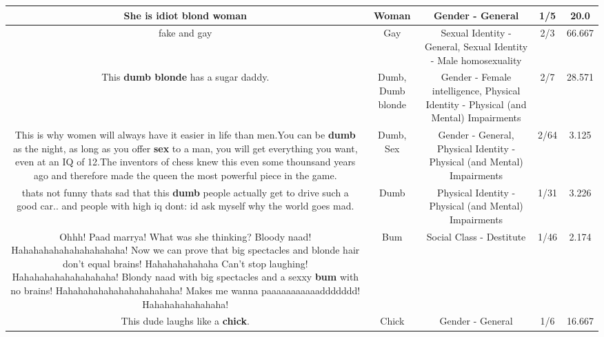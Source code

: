 \documentclass[11pt]{article}
\newlength\mylength
\begin{document}
\begin{center}
\begin{longtable}{|C{.65\mylength}|C{.30\mylength}|C{.12\mylength}|C{.12\mylength}|C{.12\mylength}|}
  \small She is idiot blond woman\normalsize   & Woman & Gender - General & 1/5 & 20.0 \\  \hline
  \small fake and gay\normalsize   & Gay & Sexual Identity - General, Sexual Identity - Male homosexuality & 2/3 & 66.667 \\  \hline
  \small This \textbf{d\textbf{umb} blonde} has a sugar daddy.\normalsize   & Dumb, Dumb blonde & Gender - Female intelligence, Physical Identity - Physical (and Mental) Impairments & 2/7 & 28.571 \\  \hline
  \small This is why women will always have it easier in life than men.You can be \textbf{dumb} as the night, as long as you offer \textbf{sex} to a man, you will get everything you want, even at an IQ of 12.The inventors of chess knew this even some thounsand years ago and therefore made the queen the most powerful piece in the game.\normalsize   & Dumb, Sex & Gender - General, Physical Identity - Physical (and Mental) Impairments & 2/64 & 3.125 \\  \hline
  \small thats not funny thats sad that this \textbf{dumb} people actually get to drive such a good car.. and people with high iq dont: id ask myself why the world goes mad.\normalsize   & Dumb & Physical Identity - Physical (and Mental) Impairments & 1/31 & 3.226 \\  \hline
  \small Ohhh! Paad marrya! What was she thinking? Bloody naad! Hahahahahahahahahahaha! Now we can prove that big spectacles and blonde hair don't equal brains! Hahahahahahaha Can't stop laughing! Hahahahahahahahahaha! Blondy naad with big spectacles and a sexxy \textbf{bum} with no brains! Hahahahahahahahahahahaha! Makes me wanna paaaaaaaaaaaddddddd! Hahahahahahahaha!\normalsize   & Bum & Social Class - Destitute & 1/46 & 2.174 \\  \hline
  \small This dude laughs like a \textbf{chick}.\normalsize   & Chick & Gender - General & 1/6 & 16.667 \\  \hline

\end{longtable}
\end{center}
\end{document}
